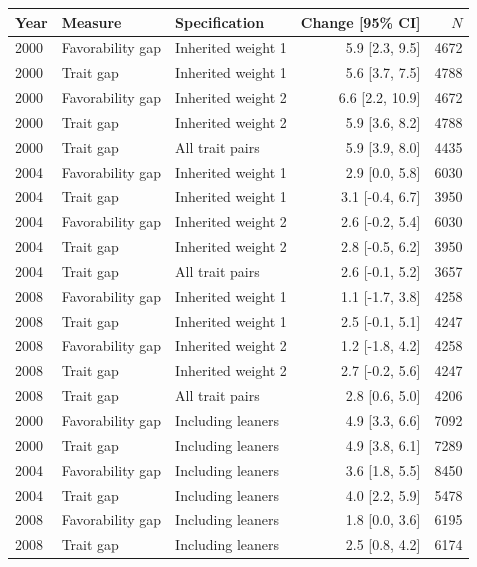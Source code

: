\begin{tabular}{lllrr}
\toprule
Year & Measure & Specification & Change [95\% CI] & $N$ \\
\midrule
2000 & Favorability gap & Inherited weight 1 & 5.9 [2.3, 9.5] & 4672 \\
2000 & Trait gap & Inherited weight 1 & 5.6 [3.7, 7.5] & 4788 \\
2000 & Favorability gap & Inherited weight 2 & 6.6 [2.2, 10.9] & 4672 \\
2000 & Trait gap & Inherited weight 2 & 5.9 [3.6, 8.2] & 4788 \\
2000 & Trait gap & All trait pairs & 5.9 [3.9, 8.0] & 4435 \\
2004 & Favorability gap & Inherited weight 1 & 2.9 [0.0, 5.8] & 6030 \\
2004 & Trait gap & Inherited weight 1 & 3.1 [-0.4, 6.7] & 3950 \\
2004 & Favorability gap & Inherited weight 2 & 2.6 [-0.2, 5.4] & 6030 \\
2004 & Trait gap & Inherited weight 2 & 2.8 [-0.5, 6.2] & 3950 \\
2004 & Trait gap & All trait pairs & 2.6 [-0.1, 5.2] & 3657 \\
2008 & Favorability gap & Inherited weight 1 & 1.1 [-1.7, 3.8] & 4258 \\
2008 & Trait gap & Inherited weight 1 & 2.5 [-0.1, 5.1] & 4247 \\
2008 & Favorability gap & Inherited weight 2 & 1.2 [-1.8, 4.2] & 4258 \\
2008 & Trait gap & Inherited weight 2 & 2.7 [-0.2, 5.6] & 4247 \\
2008 & Trait gap & All trait pairs & 2.8 [0.6, 5.0] & 4206 \\
2000 & Favorability gap & Including leaners & 4.9 [3.3, 6.6] & 7092 \\
2000 & Trait gap & Including leaners & 4.9 [3.8, 6.1] & 7289 \\
2004 & Favorability gap & Including leaners & 3.6 [1.8, 5.5] & 8450 \\
2004 & Trait gap & Including leaners & 4.0 [2.2, 5.9] & 5478 \\
2008 & Favorability gap & Including leaners & 1.8 [0.0, 3.6] & 6195 \\
2008 & Trait gap & Including leaners & 2.5 [0.8, 4.2] & 6174 \\
\bottomrule
\end{tabular}
